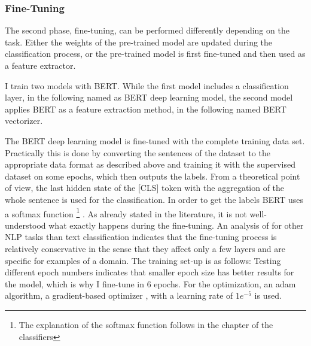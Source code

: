 \documentclass[12pt, a4paper, titlepage]{article}
\begin{document}
\subsubsection*{Fine-Tuning}
The second phase, fine-tuning, can be performed differently depending on the task. Either the weights of the pre-trained model are updated during the classification process, or the pre-trained model is first fine-tuned and then used as a feature extractor. 

I train two models with \ac{BERT}. While the first model includes a classification layer, in the following named as \ac{BERT} deep learning model, the second model applies \ac{BERT} as a feature extraction method, in the following named \ac{BERT} vectorizer. 

The \ac{BERT} deep learning model is fine-tuned with the complete training data set. Practically this is done by converting the sentences of the dataset to the appropriate data format as described above and training it with the supervised dataset on some epochs, which then outputs the labels. From a theoretical point of view, the last hidden state of the [CLS] token with the aggregation of the whole sentence is used for the classification. In order to get the labels \ac{BERT} uses a softmax function \footnote{The explanation of the softmax function follows in the chapter of the classifiers} \citep{sun2019}. As already stated in the literature, it is not well-understood what exactly happens during the fine-tuning. An analysis of \citet{merchant2020} for other NLP tasks than text classification indicates that the fine-tuning process is relatively conservative in the sense that they affect only a few layers and are specific for examples of a domain. The training set-up is as follows: Testing different epoch numbers indicates that smaller epoch size has better results for the model, which is why I fine-tune in 6 epochs. For the optimization, an adam algorithm, a gradient-based optimizer \citep{kingma2014}, with a learning rate of $1e^{-5}$ is used. 
\end{document}
